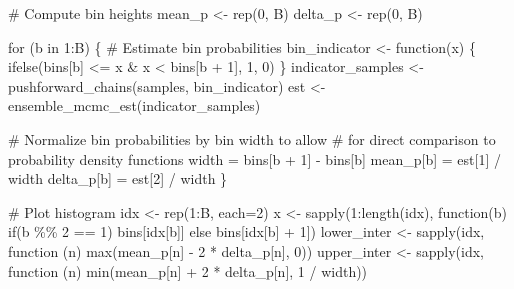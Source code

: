 \documentclass[
  letterpaper,
  DIV=11,
  numbers=noendperiod]{scrartcl}
\newenvironment{Shaded}{\begin{snugshade}}{\end{snugshade}}
\newcommand{\BuiltInTok}[1]{\textcolor[rgb]{0.00,0.23,0.31}{#1}}
\newcommand{\CommentTok}[1]{\textcolor[rgb]{0.37,0.37,0.37}{#1}}
\newcommand{\ControlFlowTok}[1]{\textcolor[rgb]{0.00,0.23,0.31}{#1}}
\newcommand{\DecValTok}[1]{\textcolor[rgb]{0.68,0.00,0.00}{#1}}
\newcommand{\KeywordTok}[1]{\textcolor[rgb]{0.00,0.23,0.31}{#1}}
\newcommand{\NormalTok}[1]{\textcolor[rgb]{0.00,0.23,0.31}{#1}}
\newcommand{\OperatorTok}[1]{\textcolor[rgb]{0.37,0.37,0.37}{#1}}
\begin{document}
\begin{Shaded}
\begin{Highlighting}[]
  \CommentTok{\# Compute bin heights}
\NormalTok{  mean\_p }\OperatorTok{\textless{}{-}}\NormalTok{ rep(}\DecValTok{0}\NormalTok{, B)}
\NormalTok{  delta\_p }\OperatorTok{\textless{}{-}}\NormalTok{ rep(}\DecValTok{0}\NormalTok{, B)}
  
  \ControlFlowTok{for}\NormalTok{ (b }\KeywordTok{in} \DecValTok{1}\NormalTok{:B) \{}
    \CommentTok{\# Estimate bin probabilities}
\NormalTok{    bin\_indicator }\OperatorTok{\textless{}{-}}\NormalTok{ function(x) \{}
\NormalTok{      ifelse(bins[b] }\OperatorTok{\textless{}=}\NormalTok{ x }\OperatorTok{\&}\NormalTok{ x }\OperatorTok{\textless{}}\NormalTok{ bins[b }\OperatorTok{+} \DecValTok{1}\NormalTok{], }\DecValTok{1}\NormalTok{, }\DecValTok{0}\NormalTok{)}
\NormalTok{    \}}
\NormalTok{    indicator\_samples }\OperatorTok{\textless{}{-}}\NormalTok{ pushforward\_chains(samples, bin\_indicator)}
\NormalTok{    est }\OperatorTok{\textless{}{-}}\NormalTok{ ensemble\_mcmc\_est(indicator\_samples)}
    
    \CommentTok{\# Normalize bin probabilities by bin width to allow}
    \CommentTok{\# for direct comparison to probability density functions}
\NormalTok{    width }\OperatorTok{=}\NormalTok{ bins[b }\OperatorTok{+} \DecValTok{1}\NormalTok{] }\OperatorTok{{-}}\NormalTok{ bins[b]}
\NormalTok{    mean\_p[b] }\OperatorTok{=}\NormalTok{ est[}\DecValTok{1}\NormalTok{] }\OperatorTok{/}\NormalTok{ width}
\NormalTok{    delta\_p[b] }\OperatorTok{=}\NormalTok{ est[}\DecValTok{2}\NormalTok{] }\OperatorTok{/}\NormalTok{ width}
\NormalTok{  \}}
  
  \CommentTok{\# Plot histogram}
\NormalTok{  idx }\OperatorTok{\textless{}{-}}\NormalTok{ rep(}\DecValTok{1}\NormalTok{:B, each}\OperatorTok{=}\DecValTok{2}\NormalTok{)}
\NormalTok{  x }\OperatorTok{\textless{}{-}}\NormalTok{ sapply(}\DecValTok{1}\NormalTok{:length(idx), function(b) }\ControlFlowTok{if}\NormalTok{(b }\OperatorTok{\%\%} \DecValTok{2} \OperatorTok{==} \DecValTok{1}\NormalTok{) bins[idx[b]]}
              \ControlFlowTok{else}\NormalTok{ bins[idx[b] }\OperatorTok{+} \DecValTok{1}\NormalTok{])}
\NormalTok{  lower\_inter }\OperatorTok{\textless{}{-}}\NormalTok{ sapply(idx, function (n)}
    \BuiltInTok{max}\NormalTok{(mean\_p[n] }\OperatorTok{{-}} \DecValTok{2} \OperatorTok{*}\NormalTok{ delta\_p[n], }\DecValTok{0}\NormalTok{))}
\NormalTok{  upper\_inter }\OperatorTok{\textless{}{-}}\NormalTok{ sapply(idx, function (n)}
    \BuiltInTok{min}\NormalTok{(mean\_p[n] }\OperatorTok{+} \DecValTok{2} \OperatorTok{*}\NormalTok{ delta\_p[n], }\DecValTok{1} \OperatorTok{/}\NormalTok{ width))}
  

\end{Highlighting}
\end{Shaded}
\end{document}
